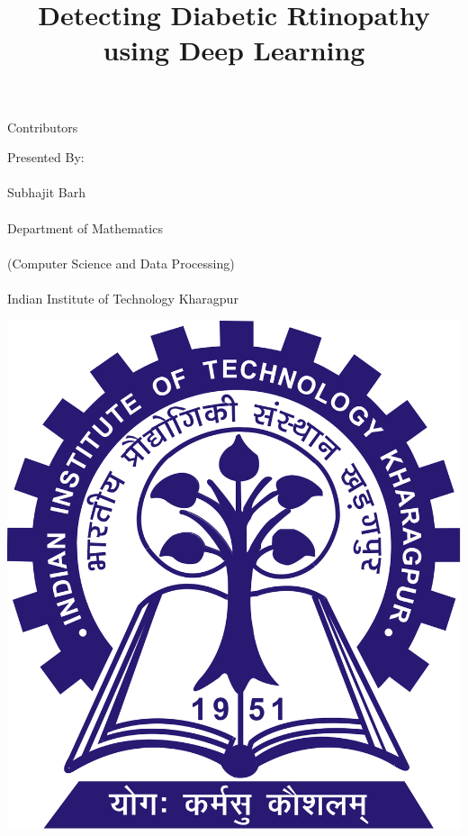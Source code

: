 \documentclass[10pt]{beamer}
\begin{document}
\title{Detecting Diabetic Rtinopathy using Deep Learning}


{
	\begin{frame}[plain]
		\titlepage
	\end{frame}
 	
}
\begingroup
{}
	\begin{frame}[c]{Contributors}
		\begin{center}
			\Huge{Presented By:\\}
			\huge{~\\Subhajit Barh\\}
			\Large{~\\Department of Mathematics\\}
			\large{~\\(Computer Science and Data Processing)\\}
			\large{~\\Indian Institute of Technology Kharagpur\\}
		\end{center}
	\begin{center}
		\includegraphics[width=1 cm,keepaspectratio]{images/kgp_logo.png}
	\end{center}
	\end{frame}
\end{document}
